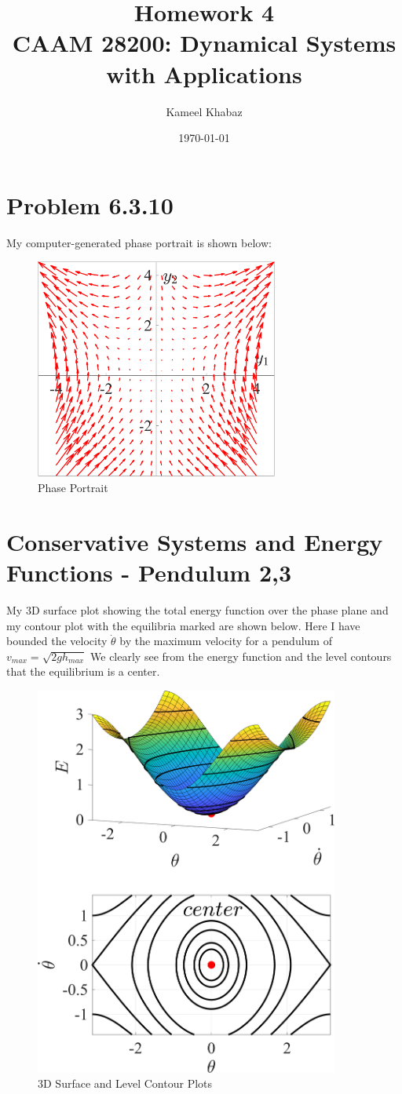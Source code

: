 \documentclass[11pt]{article}
\title{Homework 4 \large \\ CAAM 28200: Dynamical Systems with Applications}
\author{Kameel Khabaz}
\date{\today}
\begin{document}
\maketitle

\section*{Problem 6.3.10}
My computer-generated phase portrait is shown below:
\begin{figure}[h]
\centering
\includegraphics[width=8cm]{6.3.10.png}
\caption{Phase Portrait}
\end{figure}

\section*{Conservative Systems and Energy Functions - Pendulum 2,3}
My 3D surface plot showing the total energy function over the phase plane and my contour plot with the equilibria marked are shown below. Here I have bounded the velocity $\dot{\theta}$ by the maximum velocity for a pendulum of $v_{max} = \sqrt{2gh_{max}}$ We clearly see from the energy function and the level contours that the equilibrium is a center.
\begin{figure}[h]
\centering
\includegraphics[width=10cm]{Conservative.2.png}
\caption{3D Surface and Level Contour Plots}
\end{figure}
\end{document}
